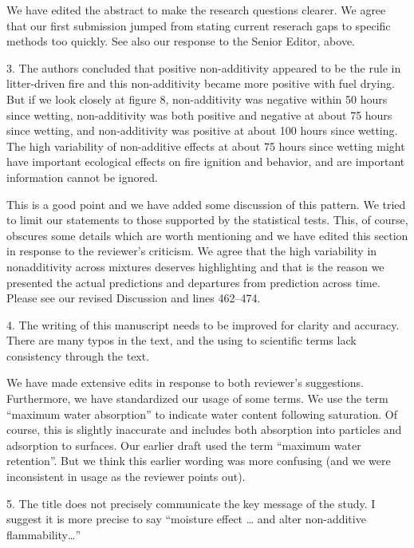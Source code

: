 \documentclass[letterpaper, 12pt]{letter}
\begin{document}
\begin{letter}{}
We have edited the abstract to make the research questions clearer. We agree
that our first submission jumped from stating current reserach gaps to specific
methods too quickly. See also our response to the Senior Editor, above.


\begin{quoting}
  3. The authors concluded that positive non-additivity appeared to be the rule
  in litter-driven fire and this non-additivity became more positive with fuel
  drying. But if we look closely at figure 8, non-additivity was negative
  within 50 hours since wetting, non-additivity was both positive and negative
  at about 75 hours since wetting, and non-additivity was positive at about 100
  hours since wetting. The high variability of non-additive effects at about 75
  hours since wetting might have important ecological effects on fire ignition
  and behavior, and are important information cannot be ignored.
\end{quoting}

This is a good point and we have added some discussion of this pattern. We
tried to limit our statements to those supported by the statistical tests.
This, of course, obscures some details which are worth mentioning and we have
edited this section in response to the reviewer's criticism. We agree that the
high variability in nonadditivity across mixtures deserves highlighting and
that is the reason we presented the actual predictions and departures from
prediction across time. Please see our revised Discussion and lines 462--474.

\begin{quoting}
  4. The writing of this manuscript needs to be improved for clarity and
  accuracy. There are many typos in the text, and the using to scientific terms
  lack consistency through the text.
\end{quoting}

We have made extensive edits in response to both reviewer's suggestions.
Furthermore, we have standardized our usage of some terms. We use the term
``maximum water absorption'' to indicate water content following saturation. Of
course, this is slightly inaccurate and includes both absorption into particles
and adsorption to surfaces. Our earlier draft used the term ``maximum water
retention''. But we think this earlier wording was more confusing (and we were
inconsistent in usage as the reviewer points out).

\begin{quoting}
  5. The title does not precisely communicate the key message of the study. I
  suggest it is more precise to say “moisture effect … and alter non-additive
  flammability…”
\end{quoting}


\end{letter}
\end{document}
